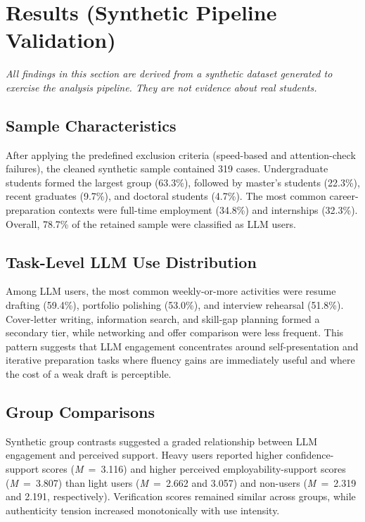 \documentclass[sigconf,review,anonymous]{acmart}
\begin{document}
\section{Results (Synthetic Pipeline Validation)}

\textit{All findings in this section are derived from a synthetic dataset
generated to exercise the analysis pipeline.  They are not evidence about
real students.}

\subsection{Sample Characteristics}

After applying the predefined exclusion criteria (speed-based and
attention-check failures), the cleaned synthetic sample contained 319 cases.
Undergraduate students formed the largest group (63.3\%), followed by
master's students (22.3\%), recent graduates (9.7\%), and doctoral students
(4.7\%).  The most common career-preparation contexts were full-time
employment (34.8\%) and internships (32.3\%).  Overall, 78.7\% of the
retained sample were classified as LLM users.

\subsection{Task-Level LLM Use Distribution}

Among LLM users, the most common weekly-or-more activities were resume
drafting (59.4\%), portfolio polishing (53.0\%), and interview rehearsal
(51.8\%).  Cover-letter writing, information search, and skill-gap planning
formed a secondary tier, while networking and offer comparison were less
frequent.  This pattern suggests that LLM engagement concentrates around
self-presentation and iterative preparation tasks where fluency gains are
immediately useful and where the cost of a weak draft is perceptible.

\subsection{Group Comparisons}

Synthetic group contrasts suggested a graded relationship between LLM
engagement and perceived support.  Heavy users reported higher
confidence-support scores (\textit{M}~=~3.116) and higher perceived
employability-support scores (\textit{M}~=~3.807) than light users
(\textit{M}~=~2.662 and 3.057) and non-users (\textit{M}~=~2.319 and
2.191, respectively).  Verification scores remained similar across groups,
while authenticity tension increased monotonically with use intensity.
\end{document}

